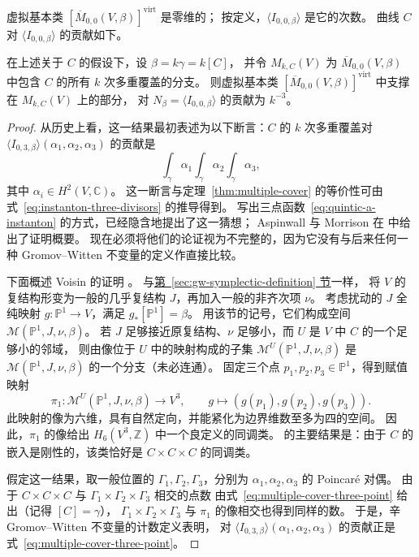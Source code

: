 虚拟基本类 $[\overline M_{0,0}(V,\beta)]^{\mathrm{virt}}$ 是零维的；
按定义，$\langle I_{0,0,\beta}\rangle$ 是它的次数。
曲线 $C$ 对 $\langle I_{0,0,\beta}\rangle$ 的贡献如下。
\begin{theorem}\label{thm:multiple-cover}
在上述关于 $C$ 的假设下，设 $\beta=k\gamma=k[C]$，
并令 $M_{k,C}(V)$ 为 $\overline M_{0,0}(V,\beta)$ 中包含 $C$ 的所有 $k$ 次多重覆盖的分支。
则虚拟基本类 $[\overline M_{0,0}(V,\beta)]^{\mathrm{virt}}$ 中支撑在 $M_{k,C}(V)$ 上的部分，
对 $N_\beta=\langle I_{0,0,\beta}\rangle$ 的贡献为 $k^{-3}$。
\end{theorem}
\begin{proof}
从历史上看，这一结果最初表述为以下断言：$C$ 的 $k$ 次多重覆盖对
$\langle I_{0,3,\beta}\rangle(\alpha_1,\alpha_2,\alpha_3)$ 的贡献是
\begin{equation}\label{eq:multiple-cover-three-point}
\int_\gamma\alpha_1\int_\gamma\alpha_2\int_\gamma\alpha_3,
\end{equation}
其中 $\alpha_i\in H^2(V,\mathbb C)$。
这一断言与定理~\ref{thm:multiple-cover} 的等价性可由式~\eqref{eq:instanton-three-divisors} 的推导得到。
 写出三点函数~\eqref{eq:quintic-a-instanton} 的方式，已经隐含地提出了这一猜想；
Aspinwall 与 Morrison 在  中给出了证明概要。
现在必须将他们的论证视为不完整的，因为它没有与后来任何一种 Gromov--Witten 不变量的定义作直接比较。

下面概述 Voisin 的证明 。
与\hyperref[sec:gw-symplectic-definition]{第~\ref*{sec:gw-symplectic-definition} 节}一样，
将 $V$ 的复结构形变为一般的几乎复结构 $J$，再加入一般的非齐次项 $\nu$。
考虑扰动的 $J$ 全纯映射 $g:\mathbb P^1\to V$，满足 $g_*[\mathbb P^1]=\beta$。
用该节的记号，它们构成空间 $\mathcal M(\mathbb P^1,J,\nu,\beta)$。
若 $J$ 足够接近原复结构、$\nu$ 足够小，而 $U$ 是 $V$ 中 $C$ 的一个足够小的邻域，
则由像位于 $U$ 中的映射构成的子集 $\mathcal M^U(\mathbb P^1,J,\nu,\beta)$
是 $\mathcal M(\mathbb P^1,J,\nu,\beta)$ 的一个分支（未必连通）。
固定三个点 $p_1,p_2,p_3\in\mathbb P^1$，得到赋值映射
\[
\pi_1:\mathcal M^U(\mathbb P^1,J,\nu,\beta)\longrightarrow V^3,
\qquad g\longmapsto(g(p_1),g(p_2),g(p_3)).
\]
此映射的像为六维，具有自然定向，并能紧化为边界维数至多为四的空间。
因此，$\pi_1$ 的像给出 $H_6(V^3,\mathbb Z)$ 中一个良定义的同调类。
 的主要结果是：由于 $C$ 的嵌入是刚性的，该类恰好是 $C\times C\times C$ 的同调类。

假定这一结果，取一般位置的 $\Gamma_1,\Gamma_2,\Gamma_3$，分别为
$\alpha_1,\alpha_2,\alpha_3$ 的 Poincaré 对偶。
由于 $C\times C\times C$ 与 $\Gamma_1\times\Gamma_2\times\Gamma_3$ 相交的点数
由式~\eqref{eq:multiple-cover-three-point} 给出（记得 $[C]=\gamma$），
$\Gamma_1\times\Gamma_2\times\Gamma_3$ 与 $\pi_1$ 的像相交也得到同样的数。
于是，辛 Gromov--Witten 不变量的计数定义表明，
对 $\langle I_{0,3,\beta}\rangle(\alpha_1,\alpha_2,\alpha_3)$ 的贡献正是式~\eqref{eq:multiple-cover-three-point}。


\end{proof}
